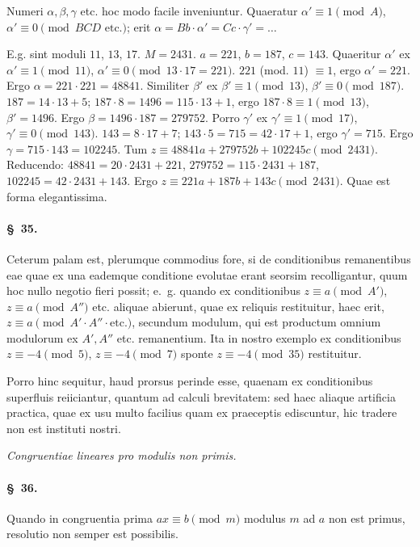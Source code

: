 \documentclass[12pt,a4paper]{article}
\theoremstyle{plain}
\theoremstyle{definition}
\theoremstyle{remark}
\newcommand{\art}[1]{\paragraph{\S\ #1.}}
\begin{document}
Numeri $\alpha, \beta, \gamma$ etc. hoc modo facile inveniuntur. Quaeratur $\alpha' \equiv 1 \pmod{A}$, $\alpha' \equiv 0 \pmod{BCD\text{ etc.}}$; erit $\alpha = Bb \cdot \alpha' = Cc \cdot \gamma' = \ldots$

E.g. sint moduli $11$, $13$, $17$. $M = 2431$. $a = 221$, $b = 187$, $c = 143$. Quaeritur $\alpha'$ ex $\alpha' \equiv 1 \pmod{11}$, $\alpha' \equiv 0 \pmod{13 \cdot 17 = 221}$. $221$ (mod. $11$) $\equiv 1$, ergo $\alpha' = 221$. Ergo $\alpha = 221 \cdot 221 = 48841$. Similiter $\beta'$ ex $\beta' \equiv 1 \pmod{13}$, $\beta' \equiv 0 \pmod{187}$. $187 = 14 \cdot 13 + 5$; $187 \cdot 8 = 1496 = 115 \cdot 13 + 1$, ergo $187 \cdot 8 \equiv 1 \pmod{13}$, $\beta' = 1496$. Ergo $\beta = 1496 \cdot 187 = 279752$. Porro $\gamma'$ ex $\gamma' \equiv 1 \pmod{17}$, $\gamma' \equiv 0 \pmod{143}$. $143 = 8 \cdot 17 + 7$; $143 \cdot 5 = 715 = 42 \cdot 17 + 1$, ergo $\gamma' = 715$. Ergo $\gamma = 715 \cdot 143 = 102245$. Tum $z \equiv 48841a + 279752b + 102245c \pmod{2431}$. Reducendo: $48841 = 20 \cdot 2431 + 221$, $279752 = 115 \cdot 2431 + 187$, $102245 = 42 \cdot 2431 + 143$. Ergo $z \equiv 221a + 187b + 143c \pmod{2431}$. Quae est forma elegantissima.

\art{35}
Ceterum palam est, plerumque commodius fore, si de conditionibus remanentibus eae quae ex una eademque conditione evolutae erant seorsim recolligantur, quum hoc nullo negotio fieri possit; e.~g. quando ex conditionibus $z \equiv a \pmod{A'}$, $z \equiv a \pmod{A''}$ etc. aliquae abierunt, quae ex reliquis restituitur, haec erit, $z \equiv a \pmod{A' \cdot A'' \cdot \text{etc.}}$, secundum modulum, qui est productum omnium modulorum ex $A', A''$ etc. remanentium. Ita in nostro exemplo ex conditionibus $z \equiv -4 \pmod{5}$, $z \equiv -4 \pmod{7}$ sponte $z \equiv -4 \pmod{35}$ restituitur.

Porro hinc sequitur, haud prorsus perinde esse, quaenam ex conditionibus superfluis reiiciantur, quantum ad calculi brevitatem: sed haec aliaque artificia practica, quae ex usu multo facilius quam ex praeceptis ediscuntur, hic tradere non est instituti nostri.

\clearpage

\begin{center}
\textit{Congruentiae lineares pro modulis non primis.}
\end{center}

\art{36}
Quando in congruentia prima $ax \equiv b \pmod{m}$ modulus $m$ ad $a$ non est primus, resolutio non semper est possibilis.
\end{document}
